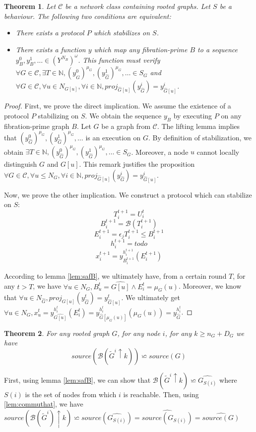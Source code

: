 \documentclass[11pt,letterpaper]{article}
\newtheorem{thm}{Theorem}
\begin{document}
\begin{thm}
	Let $\mathcal{C}$ be a network class containing rooted graphs.
	Let $S$ be a behaviour.
	The following two conditions are equivalent:
	\begin{itemize}
		\item There exists a protocol $P$ which stabilizes on $S$.
		\item There exists a function $y$ which map any fibration-prime $B$ to a sequence $y_B^0, y_B^1, \dots \in (Y^{N_B})^\omega$.
			This function must verify $\forall G \in \mathcal{C}, \exists T \in \mathds{N}, (y_{\hat G}^0)^{\mu_G}, (y_{\hat G}^1)^{\mu_G}, \dots \in S_G$
			and $\forall G \in \mathcal{C}, \forall u \in N_{G[u]}, \forall i \in \mathds{N}, proj_{\hat G[u]}(y^i_{\hat G}) = y^i_{\hat G[u]}$.
	\end{itemize}
\end{thm}
\begin{proof}
	First, we prove the direct implication. We assume the existence of a protocol $P$ stabilizing on $S$.
	We obtain the sequence $y_B$ by executing $P$ on any fibration-prime graph $B$.
	Let $G$ be a graph from $\mathcal{C}$.
	The lifting lemma implies that $(y_{\hat G}^0)^{\mu_G}, (y_{\hat G}^1)^{\mu_G}, \dots$ is an execution on $G$.
	By definition of stabilization, we obtain $\exists T \in \mathds{N}, (y_{\hat G}^0)^{\mu_G}, (y_{\hat G}^1)^{\mu_G}, \dots \in S_G$.
	Moreover, a node $u$ cannot locally distinguish $G$ and $G[u]$. This remark justifies the proposition
	$\forall G \in \mathcal{C}, \forall u \leq N_G, \forall i \in \mathds{N}, proj_{\hat G[u]}(y^i_{\hat G}) = y^i_{\hat G[u]}$.

	Now, we prove the other implication. We construct a protocol which can stabilize on $S$:
	$$T_i^{t+1} = U_i^t$$
	$$B_i^{t+1} = \mathcal{B}(T_i^{t+1})$$
	$$E_i^{t+1} = \epsilon_j T_i^{t+1} \leq B_i^{t+1}$$
	$$h_i^{t+1} = todo$$
	$$x_i^{t+1} = y_{B_i^{t+1}}^{h_i^{t+1}}(E_i^{t+1})$$

	According to lemma \ref{lem:safB}, we ultimately have, from a certain round $T$, for any $t > T$, we have $\forall u \in N_G, B_u^t = \widehat{G[u]} \wedge E_i^t = \mu_G(u)$.
	Moreover, we know that $\forall u \in N_{\hat G}, proj_{G[u]}(y^t_{\hat G}) = y^t_{\hat G[u]}$.
	We ultimately get $\forall u \in N_G, x_u^t = y_{\widehat{G[u]}}^{h_i^t}(E_i^t) = y_{\hat G[\mu_G(u)]}^{h_i^t}(\mu_G(u)) = y^{h_i^t}_{\hat G}$.
	\end{proof}


\begin{thm}
	For any rooted graph $G$, for any node $i$, for any $k \geq n_G + D_G$ we have $$source(\mathcal{B}(\tilde{G}^i \uparrow k)) \backsimeq \widehat{source(G)}$$
\end{thm}
	First, using lemma \ref{lem:safB}, we can show that $\mathcal{B}(\tilde{G}^i \uparrow k) \backsimeq \widehat{G_{S(i)}}$ where $S(i)$ is the set of nodes from which $i$ is reachable.
	Then, using \ref{lem:commuthat}, we have $source(\mathcal{B}(\tilde{G}^i) \uparrow k) \backsimeq source(\widehat{G_{S(i)}}) = \widehat{source(G_{S(i)})} = \widehat{source(G)}$
\end{document}
